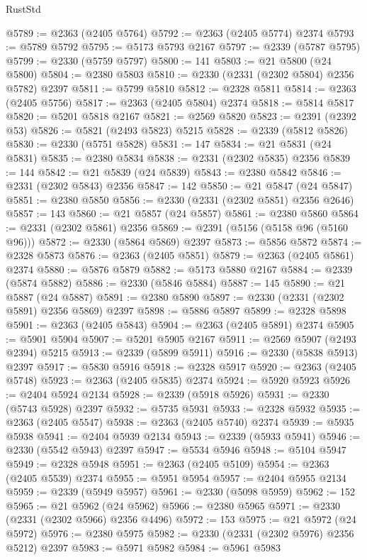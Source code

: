 \begin{lexlean}{RustStd}
\begin{coremodule}
@5789 := @2363 (@2405 @5764)
@5792 := @2363 (@2405 @5774) @2374
@5793 := @5789 @5792
@5795 := @5173 @5793 @2167
@5797 := @2339 (@5787 @5795)
@5799 := @2330 (@5759 @5797)
@5800 := 141
@5803 := @21 @5800 (@24 @5800)
@5804 := @2380 @5803
@5810 := @2330 (@2331 (@2302 @5804) @2356 @5782) @2397
@5811 := @5799 @5810
@5812 := @2328 @5811
@5814 := @2363 (@2405 @5756)
@5817 := @2363 (@2405 @5804) @2374
@5818 := @5814 @5817
@5820 := @5201 @5818 @2167
@5821 := @2569 @5820
@5823 := @2391 (@2392 @53)
@5826 := @5821 (@2493 @5823) @5215
@5828 := @2339 (@5812 @5826)
@5830 := @2330 (@5751 @5828)
@5831 := 147
@5834 := @21 @5831 (@24 @5831)
@5835 := @2380 @5834
@5838 := @2331 (@2302 @5835) @2356
@5839 := 144
@5842 := @21 @5839 (@24 @5839)
@5843 := @2380 @5842
@5846 := @2331 (@2302 @5843) @2356
@5847 := 142
@5850 := @21 @5847 (@24 @5847)
@5851 := @2380 @5850
@5856 := @2330 (@2331 (@2302 @5851) @2356 @2646)
@5857 := 143
@5860 := @21 @5857 (@24 @5857)
@5861 := @2380 @5860
@5864 := @2331 (@2302 @5861) @2356
@5869 := @2391 (@5156 (@5158 @96 (@5160 @96)))
@5872 := @2330 (@5864 @5869) @2397
@5873 := @5856 @5872
@5874 := @2328 @5873
@5876 := @2363 (@2405 @5851)
@5879 := @2363 (@2405 @5861) @2374
@5880 := @5876 @5879
@5882 := @5173 @5880 @2167
@5884 := @2339 (@5874 @5882)
@5886 := @2330 (@5846 @5884)
@5887 := 145
@5890 := @21 @5887 (@24 @5887)
@5891 := @2380 @5890
@5897 := @2330 (@2331 (@2302 @5891) @2356 @5869) @2397
@5898 := @5886 @5897
@5899 := @2328 @5898
@5901 := @2363 (@2405 @5843)
@5904 := @2363 (@2405 @5891) @2374
@5905 := @5901 @5904
@5907 := @5201 @5905 @2167
@5911 := @2569 @5907 (@2493 @2394) @5215
@5913 := @2339 (@5899 @5911)
@5916 := @2330 (@5838 @5913) @2397
@5917 := @5830 @5916
@5918 := @2328 @5917
@5920 := @2363 (@2405 @5748)
@5923 := @2363 (@2405 @5835) @2374
@5924 := @5920 @5923
@5926 := @2404 @5924 @2134
@5928 := @2339 (@5918 @5926)
@5931 := @2330 (@5743 @5928) @2397
@5932 := @5735 @5931
@5933 := @2328 @5932
@5935 := @2363 (@2405 @5547)
@5938 := @2363 (@2405 @5740) @2374
@5939 := @5935 @5938
@5941 := @2404 @5939 @2134
@5943 := @2339 (@5933 @5941)
@5946 := @2330 (@5542 @5943) @2397
@5947 := @5534 @5946
@5948 := @5104 @5947
@5949 := @2328 @5948
@5951 := @2363 (@2405 @5109)
@5954 := @2363 (@2405 @5539) @2374
@5955 := @5951 @5954
@5957 := @2404 @5955 @2134
@5959 := @2339 (@5949 @5957)
@5961 := @2330 (@5098 @5959)
@5962 := 152
@5965 := @21 @5962 (@24 @5962)
@5966 := @2380 @5965
@5971 := @2330 (@2331 (@2302 @5966) @2356 @4496)
@5972 := 153
@5975 := @21 @5972 (@24 @5972)
@5976 := @2380 @5975
@5982 := @2330 (@2331 (@2302 @5976) @2356 @5212) @2397
@5983 := @5971 @5982
@5984 := @5961 @5983

\end{coremodule}
\end{lexlean}
